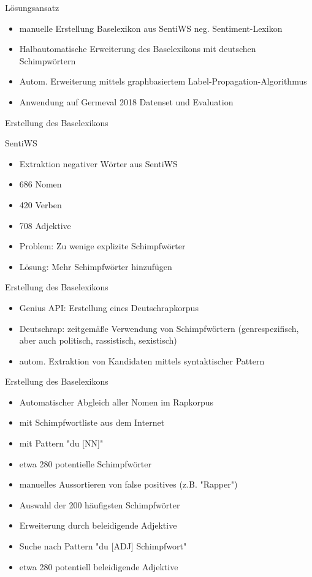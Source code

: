 \documentclass{beamer}
\begin{document}
\begin{frame}{Lösungsansatz}
\begin{itemize}
\item manuelle Erstellung Baselexikon aus SentiWS neg. Sentiment-Lexikon
\item Halbautomatische Erweiterung des Baselexikons mit deutschen Schimpwörtern
\item Autom. Erweiterung mittels graphbasiertem Label-Propagation-Algorithmus
\item Anwendung auf Germeval 2018 Datenset und Evaluation
\end{itemize}
\end{frame}
\begin{frame}{Erstellung des Baselexikons}
\begin{block}{SentiWS}
	\begin{itemize}
		\item Extraktion negativer Wörter aus SentiWS
		\item 686 Nomen
		\item 420 Verben
		\item 708 Adjektive
		\item Problem: Zu wenige explizite Schimpfwörter
		\item Lösung: Mehr Schimpfwörter hinzufügen
	\end{itemize}
\end{block}
\end{frame}

\begin{frame}{Erstellung des Baselexikons}
\begin{itemize}
\item Genius API: Erstellung eines Deutschrapkorpus 
\item Deutschrap: zeitgemäße Verwendung von Schimpfwörtern (genrespezifisch, aber auch politisch, rassistisch, sexistisch)
\item autom. Extraktion von Kandidaten mittels syntaktischer Pattern
\end{itemize}
\end{frame}

\begin{frame}{Erstellung des Baselexikons}
	\begin{itemize}
		\item Automatischer Abgleich aller Nomen im Rapkorpus
		\item mit Schimpfwortliste aus dem Internet
		\item mit Pattern "du [NN]"
		\item etwa 280 potentielle Schimpfwörter
		\item manuelles Aussortieren von false positives (z.B. "Rapper")
		\item Auswahl der 200 häufigsten Schimpfwörter
		\item Erweiterung durch beleidigende Adjektive
		\item Suche nach Pattern "du [ADJ] Schimpfwort"
		\item etwa 280 potentiell beleidigende Adjektive
	\end{itemize}
\end{frame}
\end{document}
